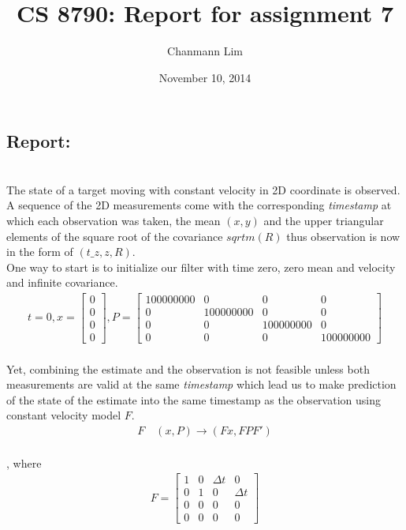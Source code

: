 \documentclass[a4paper]{article}
\begin{document}
\title{CS 8790: Report for assignment 7}
\author{Chanmann Lim}
\date{November 10, 2014}
\maketitle

\subsection*{Report:} ~\\
\indent The state of a target moving with constant velocity in 2D coordinate is observed. A sequence of the 2D measurements come with the corresponding \emph{timestamp} at which each observation was taken, the mean $(x, y)$ and the upper triangular elements of the square root of the covariance $sqrtm(R)$ thus observation is now in the form of $(t\_z, z, R)$. \\

One way to start is to initialize our filter with time zero, zero mean and velocity and infinite covariance. \\
\begin{align*}
t = 0, 
x = \begin{bmatrix}
		0 \\ 0 \\ 0 \\ 0
	\end{bmatrix}, 
P = \begin{bmatrix}
		100000000 & 0 & 0 & 0 \\
		0 & 100000000 & 0 & 0 \\
		0 & 0 & 100000000 & 0 \\
		0 & 0 & 0 & 100000000
	\end{bmatrix}
\end{align*} \\
\noindent Yet, combining the estimate and the observation is not feasible unless both measurements are valid at the same \emph{timestamp} which lead us to make prediction of the state of the estimate into the same timestamp as the observation using constant velocity model $F$. \\
\begin{align*}
F \quad (x, P) \to (Fx, FPF')
\end{align*} \\
, where
\begin{align*}
F = \begin{bmatrix}
		1 & 0 & \Delta{}t & 0 \\
		0 & 1 & 0 & \Delta{}t \\
		0 & 0 & 0 & 0 \\
		0 & 0 & 0 & 0
	\end{bmatrix}
\end{align*} \\
\end{document}
